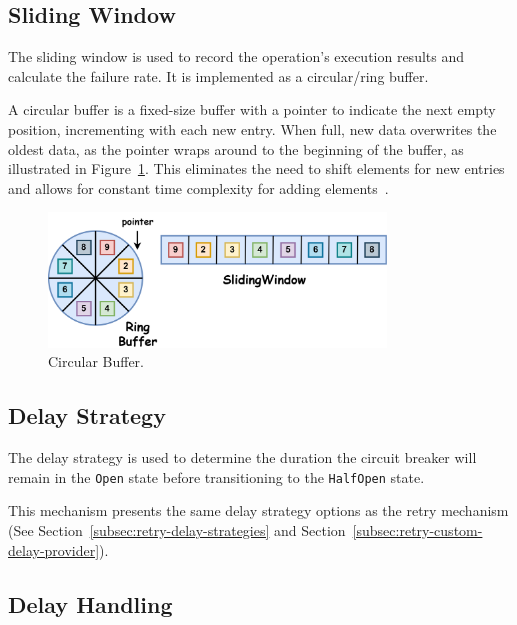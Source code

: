 \subsection{Sliding Window}\label{subsec:cbreaker-sliding-window}

The sliding window is used to record the operation's execution results and calculate the failure rate.
It is implemented as a circular/ring buffer.

A circular buffer is a fixed-size buffer with a pointer to indicate the next empty position, incrementing with each new entry.
When full, new data overwrites the oldest data, as the pointer wraps around to the beginning of the buffer, as illustrated in Figure~\ref{fig:05_circular-buffer}.
This eliminates the need to shift elements for new entries and allows for constant time complexity for adding elements~\cite{circular-buffer}.

\begin{figure}[!htb]
    \centering
    \includegraphics[width=0.8\textwidth]{../figures/05_circular-buffer}
    \caption{Circular Buffer.}
    \label{fig:05_circular-buffer}
\end{figure}

\subsection{Delay Strategy}\label{subsec:cbreaker-delay-strategy}

The delay strategy is used
to determine the duration the circuit breaker will remain in the \texttt{Open} state before transitioning to the \texttt{HalfOpen} state.

This mechanism presents the same delay strategy options as the retry mechanism (See Section~\ref{subsec:retry-delay-strategies} and Section~\ref{subsec:retry-custom-delay-provider}).

\subsection{Delay Handling}\label{subsec:cbreaker-delay-handling}

